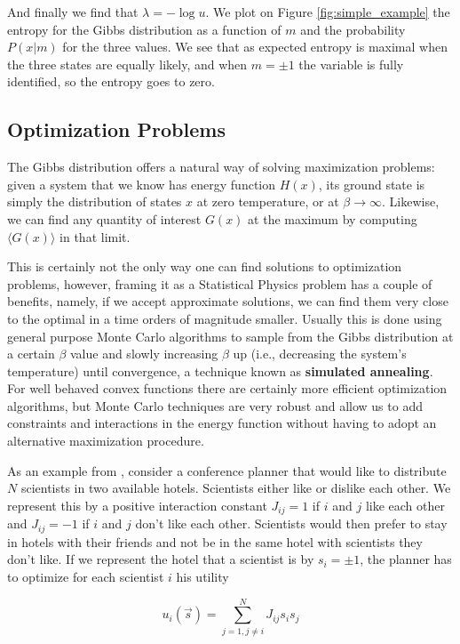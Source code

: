 And finally we find that $\lambda = -\log u$. We plot on Figure \ref{fig:simple_example} the entropy for the Gibbs distribution as a function of $m$ and the probability $P(x|m)$ for the three values. We see that as expected entropy is maximal when the three states are equally likely, and when $m = \pm 1$ the variable is fully identified, so the entropy goes to zero.


\subsection{Optimization Problems}

The Gibbs distribution offers a natural way of solving maximization problems: given a system that we know has energy function $H(x)$, its ground state is simply the distribution of states $x$ at zero temperature, or at $\beta \to \infty$. Likewise, we can find any quantity of interest $G(x)$ at the maximum by computing $\langle G(x) \rangle$ in that limit. 

This is certainly not the only way one can find solutions to optimization problems, however, framing it as a Statistical Physics problem has a couple of benefits, namely, if we accept approximate solutions, we can find them very close to the optimal in a time orders of magnitude smaller. Usually this is done using general purpose Monte Carlo algorithms to sample from the Gibbs distribution at a certain $\beta$ value and slowly increasing $\beta$ up (i.e., decreasing the system's temperature) until convergence, a technique known as \textbf{simulated annealing}. For well behaved convex functions there are certainly more efficient optimization algorithms, but Monte Carlo techniques are very robust and allow us to add constraints and interactions in the energy function without having to adopt an alternative maximization procedure.

As an example from \cite{mezard2004}, consider a conference planner that would like to distribute $N$ scientists in two available hotels. Scientists either like or dislike each other. We represent this by a positive interaction constant $J_{ij} = 1$ if $i$ and $j$ like each other and $J_{ij} = -1$ if $i$ and $j$ don't like each other. Scientists would then prefer to stay in hotels with their friends and not be in the same hotel with scientists they don't like. If we represent the hotel that a scientist is by $s_i = \pm 1$, the planner has to optimize for each scientist $i$ his utility

\begin{equation}
   u_i (\vec{s}) = \sum_{j=1, j\neq i}^N J_{ij} s_i s_j
\end{equation}

